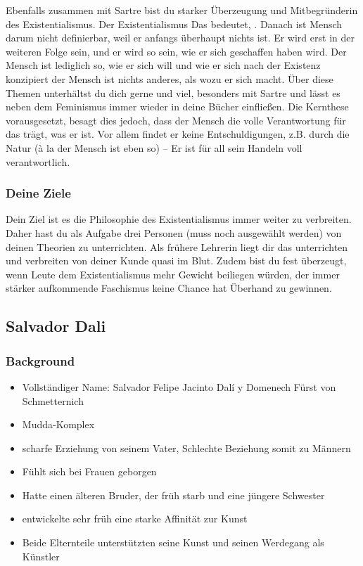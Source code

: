 \documentclass[12pt, a4paper, openany]{report}
\begin{document}
Ebenfalls zusammen mit Sartre bist du starker Überzeugung und Mitbegründerin des Existentialismus. Der Existentialismus  Das bedeutet, . Danach ist Mensch darum nicht definierbar, weil er anfangs überhaupt nichts ist. Er wird erst in der weiteren Folge sein, und er wird so sein, wie er sich geschaffen haben wird. Der Mensch ist lediglich so, wie er sich will und wie er sich nach der Existenz konzipiert der Mensch ist nichts anderes, als wozu er sich macht. Über diese Themen unterhältst du dich gerne und viel, besonders mit Sartre und lässt es neben dem Feminismus immer wieder in deine Bücher einfließen. Die Kernthese vorausgesetzt, besagt dies jedoch, dass der Mensch die volle Verantwortung für das trägt, was er ist. Vor allem findet er keine Entschuldigungen, z.B. durch die Natur (à la der Mensch ist eben so) – Er ist für all sein Handeln voll verantwortlich. 





\subsubsection{Deine Ziele}

Dein Ziel ist es die Philosophie des Existentialismus immer weiter zu verbreiten. Daher hast du als Aufgabe drei Personen (muss noch ausgewählt werden) von deinen Theorien zu unterrichten. Als frühere Lehrerin liegt dir das unterrichten und verbreiten von deiner Kunde quasi im Blut. Zudem bist du fest überzeugt, wenn Leute dem Existentialismus mehr Gewicht beiliegen würden, der immer stärker aufkommende Faschismus keine Chance hat Überhand zu gewinnen. 

\subsection{Salvador Dali}
\subsubsection{Background}
\begin{itemize}
\item Vollständiger Name: Salvador Felipe Jacinto Dalí y Domenech Fürst von Schmetternich
\item Mudda-Komplex
\item scharfe Erziehung von seinem Vater, Schlechte Beziehung somit zu Männern
\item Fühlt sich bei Frauen geborgen 
\item Hatte einen älteren Bruder, der früh starb und eine jüngere Schwester
\item entwickelte sehr früh eine starke Affinität zur Kunst
\item Beide Elternteile unterstützten seine Kunst und seinen Werdegang als Künstler
\end{itemize}
\end{document}

